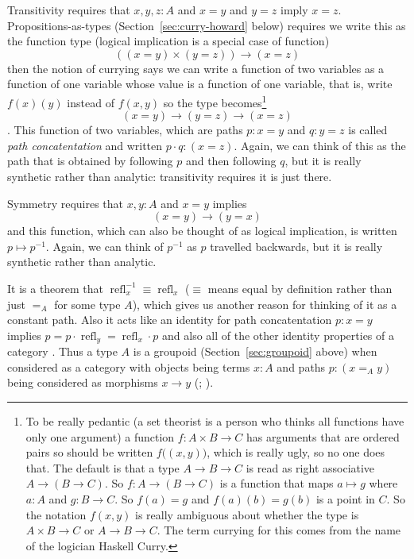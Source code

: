\documentclass[11pt]{article}
\DeclareMathOperator{\refl}{refl}
\begin{document}
Transitivity requires that $x, y, z : A$ and $x = y$ and $y = z$
imply $x = z$.  Propositions-as-types (Section~\ref{sec:curry-howard} below)
requires we write this as the function type (logical implication is a special
case of function)
$$
   ((x = y) \times (y = z)) \to (x = z)
$$
then the notion of currying says we can write a function of two variables
as a function of one variable whose value is a function of one variable,
that is, write $f(x)(y)$ instead of $f(x, y)$ so the type
becomes\footnote{To be really pedantic (a set theorist is a person who
thinks all functions have only one argument)
a function $f : A \times B \to C$ has arguments
that are ordered pairs so should be written $f\bigl((x, y)\bigr)$, which is
really ugly, so no one does that.  The default is that a type
$A \to B \to C$ is read as right associative $A \to (B \to C)$.
So $f : A \to (B \to C)$ is a function that maps $a \mapsto g$ where
$a : A$ and $g : B \to C$.  So $f(a) = g$ and $f(a)(b) = g(b)$ is
a point in $C$.  So the notation $f(x, y)$ is really
ambiguous about whether the type
is $A \times B \to C$ or $A \to B \to C$.
The term currying for this comes from the name of the logician
Haskell Curry.\label{foot:currying}}
$$
   (x = y) \to (y = z) \to (x = z)
$$
.  This function of two variables, which are
paths $p : x = y$ and $q : y = z$ is called \emph{path concatentation}
and written $p \cdot q : (x = z)$.
Again, we can think of this as the path that is obtained by following $p$
and then following $q$, but it is really synthetic rather than analytic:
transitivity requires it is just there.

Symmetry requires that $x, y : A$ and $x = y$ implies
$$
   (x = y) \to (y = x)
$$
and this function, which can also be thought of as logical implication,
is written $p \mapsto p^{-1}$.
Again, we can think of $p^{-1}$ as $p$ travelled backwards,
but it is really synthetic rather than analytic.

It is a theorem that $\refl_x^{-1} \equiv \refl_x$
 ($\equiv$ means equal by definition
rather than just $=_A$ for some type $A$), which gives us another reason
for thinking of it as a constant path.  Also it acts like an identity
for path concatentation $p : x = y$ implies
$p = p \cdot \refl_y = \refl_x \cdot p$ and also all of the other identity
properties of a category
.
Thus a type $A$ is a groupoid (Section~\ref{sec:groupoid} above)
when considered as a category with objects being terms $x : A$ and
paths $p : (x =_A y)$ being considered as morphisms $x \to y$
(; \citealp{hofmann-streicher}).
\end{document}
